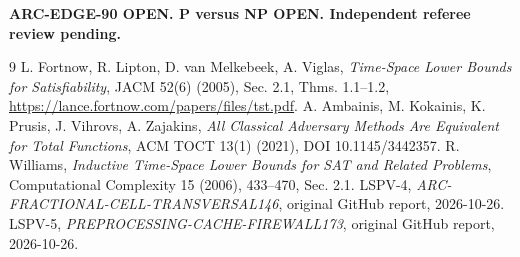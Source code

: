 \documentclass[11pt]{article}
\begin{document}
\noindent\textbf{ARC-EDGE-90 OPEN. P versus NP OPEN.
Independent referee review pending.}
\begin{thebibliography}{9}
 L. Fortnow, R. Lipton, D. van Melkebeek,
A. Viglas, \emph{Time-Space Lower Bounds for Satisfiability},
JACM 52(6) (2005), Sec. 2.1, Thms. 1.1--1.2,
\url{https://lance.fortnow.com/papers/files/tst.pdf}.
 A. Ambainis, M. Kokainis, K. Prusis,
J. Vihrovs, A. Zajakins,
\emph{All Classical Adversary Methods Are Equivalent for Total Functions},
ACM TOCT 13(1) (2021), DOI 10.1145/3442357.
 R. Williams,
\emph{Inductive Time-Space Lower Bounds for SAT and Related Problems},
Computational Complexity 15 (2006), 433--470, Sec. 2.1.
 LSPV-4,
\emph{ARC-FRACTIONAL-CELL-TRANSVERSAL146}, original GitHub report, 2026-10-26.
 LSPV-5,
\emph{PREPROCESSING-CACHE-FIREWALL173}, original GitHub report, 2026-10-26.
\end{thebibliography}
\end{document}
